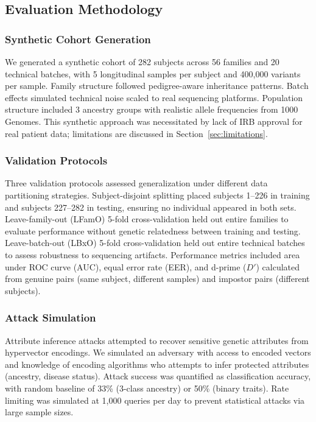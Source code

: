 \documentclass[11pt,letterpaper]{article}
\begin{document}
\subsection{Evaluation Methodology}

\subsubsection{Synthetic Cohort Generation}

We generated a synthetic cohort of 282 subjects across 56 families and 20 technical batches, with 5 longitudinal samples per subject and 400,000 variants per sample. Family structure followed pedigree-aware inheritance patterns. Batch effects simulated technical noise scaled to real sequencing platforms. Population structure included 3 ancestry groups with realistic allele frequencies from 1000 Genomes. This synthetic approach was necessitated by lack of IRB approval for real patient data; limitations are discussed in Section~\ref{sec:limitations}.

\subsubsection{Validation Protocols}

Three validation protocols assessed generalization under different data partitioning strategies. Subject-disjoint splitting placed subjects 1--226 in training and subjects 227--282 in testing, ensuring no individual appeared in both sets. Leave-family-out (LFamO) 5-fold cross-validation held out entire families to evaluate performance without genetic relatedness between training and testing. Leave-batch-out (LBxO) 5-fold cross-validation held out entire technical batches to assess robustness to sequencing artifacts. Performance metrics included area under ROC curve (AUC), equal error rate (EER), and d-prime ($D'$) calculated from genuine pairs (same subject, different samples) and impostor pairs (different subjects).

\subsubsection{Attack Simulation}

Attribute inference attacks attempted to recover sensitive genetic attributes from hypervector encodings. We simulated an adversary with access to encoded vectors and knowledge of encoding algorithms who attempts to infer protected attributes (ancestry, disease status). Attack success was quantified as classification accuracy, with random baseline of 33\% (3-class ancestry) or 50\% (binary traits). Rate limiting was simulated at 1,000 queries per day to prevent statistical attacks via large sample sizes.
\end{document}

